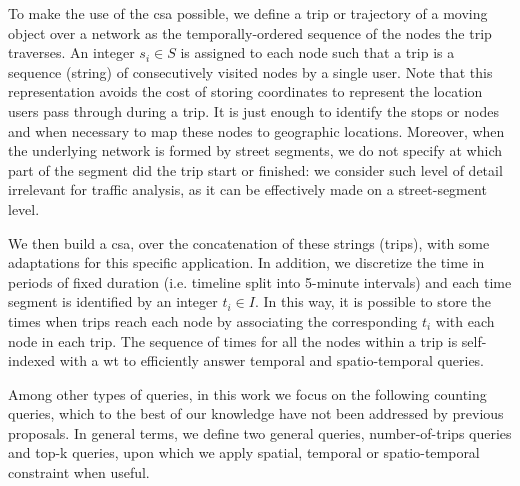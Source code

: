 	To make the
	use of the \gls{csa} possible, we define a trip or trajectory of a moving object
	over a network as the temporally-ordered sequence of the nodes the trip
	traverses. An integer $s_i \in S$ is assigned to each node such that a trip is a sequence (string) of consecutively visited nodes by a single user. Note that this representation avoids the cost of storing coordinates to represent the location users pass through during a trip. It is just enough to identify the stops or nodes and when necessary to map these nodes to geographic locations. Moreover, when the underlying network is formed by street segments, we do not specify at which part of the segment did the trip start or finished: we consider such level of detail irrelevant for traffic analysis, as it can be effectively made on a street-segment level.
	
	We then build a \gls{csa}, over the concatenation of
	these strings (trips), with some adaptations for this
	specific application. In addition, we discretize the time in periods of fixed
	duration (i.e. timeline split into 5-minute intervals) and each time
	segment is identified by an integer $t_i \in I$. In this way, it is possible
	to store the times when trips reach each node by associating the
	corresponding $t_i$ with each node in each trip. The sequence of
	times for all the nodes within a trip is self-indexed with a \gls{wt}
	to efficiently answer temporal and spatio-temporal queries.

	Among other types of queries, in this work we focus on the following counting queries, which to the best of our knowledge have not been  addressed by previous proposals. In general terms, we define two general queries, number-of-trips queries and top-k queries, upon which we apply spatial, temporal or spatio-temporal constraint when useful.

